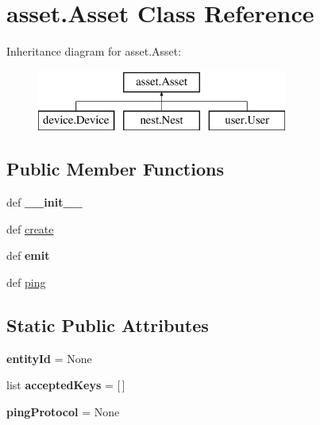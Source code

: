 \hypertarget{classasset_1_1_asset}{\section{asset.\-Asset Class Reference}
\label{classasset_1_1_asset}
}
Inheritance diagram for asset.\-Asset\-:\begin{figure}[H]
\begin{center}
\leavevmode
\includegraphics[height=2.000000cm]{classasset_1_1_asset}
\end{center}
\end{figure}
\subsection*{Public Member Functions}
\begin{DoxyCompactItemize}
\item 
\hypertarget{classasset_1_1_asset_a1d5701776cb8a710192c9b1d356e76bc}{def {\bfseries \-\_\-\-\_\-init\-\_\-\-\_\-}}\label{classasset_1_1_asset_a1d5701776cb8a710192c9b1d356e76bc}

\item 
def \hyperlink{classasset_1_1_asset_a7628151c7b06d24d0150107681e90f59}{create}
\item 
\hypertarget{classasset_1_1_asset_aa64bdb5546de358c271232f0fb4863f8}{def {\bfseries emit}}\label{classasset_1_1_asset_aa64bdb5546de358c271232f0fb4863f8}

\item 
def \hyperlink{classasset_1_1_asset_a0ff2515aa2e570a09d094f5cc8ddb144}{ping}
\end{DoxyCompactItemize}
\subsection*{Static Public Attributes}
\begin{DoxyCompactItemize}
\item 
\hypertarget{classasset_1_1_asset_ad539bb2223a6c5f80d432f07ff2742cf}{{\bfseries entity\-Id} = None}\label{classasset_1_1_asset_ad539bb2223a6c5f80d432f07ff2742cf}

\item 
\hypertarget{classasset_1_1_asset_a0cbfe18462e6929345578c21ce4603d7}{list {\bfseries accepted\-Keys} = \mbox{[}$\,$\mbox{]}}\label{classasset_1_1_asset_a0cbfe18462e6929345578c21ce4603d7}

\item 
\hypertarget{classasset_1_1_asset_a78c7f7bf78070c3f8d6d70894d6d95ec}{{\bfseries ping\-Protocol} = None}\label{classasset_1_1_asset_a78c7f7bf78070c3f8d6d70894d6d95ec}

\end{DoxyCompactItemize}


